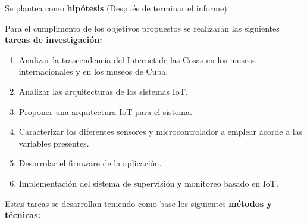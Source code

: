     Se plantea como \textbf{hipótesis} (Después de terminar el informe)%
    
    \newpage
    
    Para el cumplimento de los objetivos propuestos se realizarán las siguientes \textbf{tareas de investigación:}

    \begin{enumerate} %
        \item Analizar la trascendencia del Internet de las Cosas en los museos internacionales y en los museos de Cuba.
        \item Analizar las arquitecturas de los sistemas IoT.
        \item Proponer una arquitectura IoT para el sistema.
        \item Caracterizar los diferentes sensores y microcontrolador a emplear acorde a las variables presentes.
        \item Desarrolar el firmware de la aplicación.
        \item Implementación del sistema de supervisión y monitoreo basado en IoT.
    \end{enumerate}

    Estas tareas se desarrollan teniendo como base los siguientes \textbf{métodos y técnicas:}

